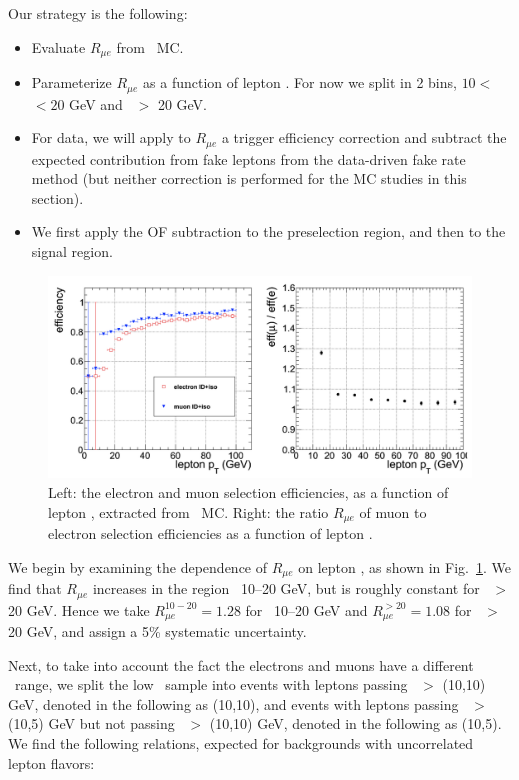 Our strategy is the following:

\begin{itemize}
\item Evaluate $R_{\mu e}$ from \ttbar\ MC. 
\item Parameterize $R_{\mu e}$ as a function of lepton \pt. For now we split in 2 bins, $10 < $ \pt\ $ < 20$ GeV
and \pt\ $>$ 20 GeV.
\item For data, we will apply to $R_{\mu e}$ a trigger efficiency correction and subtract the 
expected contribution from fake leptons from the data-driven fake rate method (but neither correction is performed for the
MC studies in this section).
\item We first apply the OF subtraction to the preselection region, and then to the signal region. 
\end{itemize}

\begin{figure}[tbh]
\begin{center}
\includegraphics[width=1\linewidth]{plots/r_ttmadgraph.png}
\caption{\label{fig:rtt}\protect 
Left: the electron and muon selection efficiencies, as a function of lepton \pt, extracted
from \ttbar\ MC. Right: the ratio $R_{\mu e}$ of muon to electron selection efficiencies
as a function of lepton \pt.
}
\end{center}
\end{figure}

We begin by examining the dependence of $R_{\mu e}$ on lepton \pt, as shown in Fig.~\ref{fig:rtt}.
We find that $R_{\mu e}$ increases in the region \pt\ 10--20 GeV, but is roughly constant for \pt\ $>$ 20 GeV.
Hence we take $R_{\mu e}^{10-20} = 1.28$ for \pt\ 10--20 GeV and $R_{\mu e}^{>20} = 1.08$ for \pt\ $>$ 20 GeV, and assign
a 5\% systematic uncertainty.

Next, to take into account the fact the electrons and muons have a different \pt\ range, we split the low \pt\
sample into events with leptons passing \pt\ $>$ (10,10) GeV, denoted in the following as (10,10), and 
events with leptons passing \pt\ $>$ (10,5) GeV but not passing \pt\ $>$ (10,10) GeV, denoted in the following
as (10,5). We find the following relations, expected for backgrounds with uncorrelated lepton flavors:

